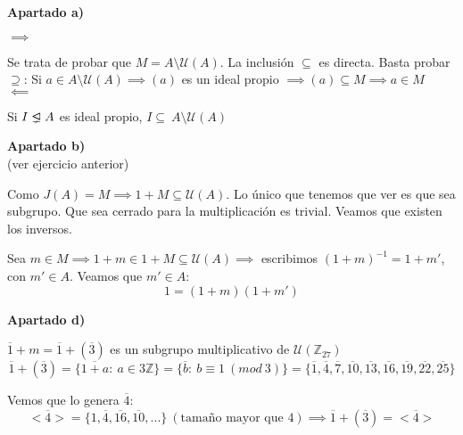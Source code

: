 \documentclass[openany]{book}
\begin{document}
\begin{exercise}
    \begin{flushright}
        \textbf{Apartado a)}
    \end{flushright}
    $  $\\
    $ \implies $

    Se trata de probar que $ M = A \setminus \mathcal{U}(A) $. La inclusión $ \subseteq  $ es directa. Basta probar $ \supseteq $: Si $ a \in A \setminus \mathcal{U}(A) \implies (a) $ es un ideal propio $ \implies (a) \subseteq M \implies a \in M $\\
    $ \impliedby $

    Si $ I \properideal A $ es ideal propio, $ I \subseteq\ A \setminus \mathcal{U}(A) $

    \begin{flushright}
        \textbf{Apartado b)}\\
        (ver ejercicio anterior)
    \end{flushright}
    
    Como $ J(A) = M \implies 1+M \subseteq \mathcal{U}(A)$. Lo único que tenemos que ver es que sea subgrupo. Que sea cerrado para la multiplicación es trivial. Veamos que existen los inversos.

    Sea $ m \in M \implies 1+m \in 1+M \subseteq \mathcal{U}(A)\implies $ escribimos $ (1+m)^{-1} = 1+m' $, con $ m' \in A $. Veamos que $ m' \in A $:
    $$ 1 = (1+m)(1+m') $$


    
    \begin{flushright}
        \textbf{Apartado d)}
    \end{flushright}
    $ \overline{1}+m = \overline{1}+(\overline{3})  $ es un subgrupo multiplicativo de $ \mathcal{U}(\mathbb{Z}_{27}) $
    $$ \overline{1}+(\overline{3}) = \{\overline{1+a}:\ a \in 3\mathbb{Z}\} = \{\overline{b}:\ b \equiv 1\ (mod\ 3)\} = \{\overline{1},\overline{4},\overline{7},\overline{10},\overline{13},\overline{16},\overline{19},\overline{22},\overline{25}\} $$

    Vemos que lo genera $ \overline{4} $:
    $$ <\overline{4}> = \{1,\overline{4},\overline{16},\overline{10},...\}\ (\text{tamaño mayor que 4}) \implies \overline{1}+(\overline{3}) = <\overline{4}> $$

\end{exercise}
\end{document}
